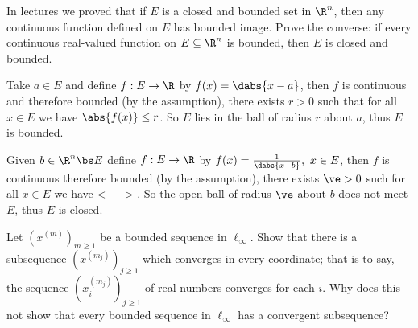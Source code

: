 \begin{problem}In lectures we proved that if $E$ is a closed and bounded set in $\R^n$, then any continuous function defined on $E$ has bounded image. Prove the converse: if every continuous real-valued function on $E \subseteq \R^n$ is bounded, then $E$ is closed and bounded.



\end{problem}

\begin{solution}[\bf Solution.]Take $a\in E$ and define $f:E\to\R$ by $f(x) = \dabs{x-a}$, then $f$ is continuous and therefore bounded (by the assumption), there exists $r>0$ such that for all $x\in E$ we have $\abs{f(x)} \leq r$. So $E$ lies in the ball of radius $r$ about $a$, thus $E$ is bounded.

Given $b\in \R^n\bs E$ define $f:E\to \R$ by $f(x) = \frac 1{\dabs{x-b}},\ x\in E$, then $f$ is continuous therefore bounded (by the assumption), there exists $\ve>0$ such for all $x\in E$ we have 
\be
{} <  \ \ra \  > \ve.
\ee
So the open ball of radius $\ve$ about $b$ does not meet $E$, thus $E$ is closed.



\end{solution}

\begin{problem}Let $(x^{(m)})_{m\geq 1}$ be a bounded sequence in $\ell_\infty$. Show that there is a subsequence $(x^{(m_j)})_{j\geq 1}$ which converges in every coordinate; that is to say, the sequence $(x^{(m_j)}_i)_{j\geq 1}$ of real numbers converges for each $i$. Why does this not show that every bounded sequence in $\ell_\infty$ has a convergent subsequence?



\end{problem}

